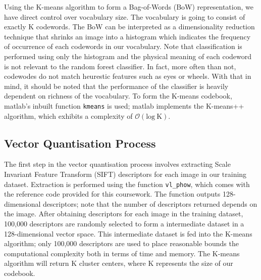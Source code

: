 \documentclass[a4paper,pra,twocolumn,10pt,aps,longbibliography,nobalancelastpage]{article}
\begin{document}
Using the K-means algorithm to form a Bag-of-Words (BoW) representation, we have direct control over vocabulary size. The vocabulary is going to consist of exactly K codewords. The BoW can be interpreted as a dimensionality reduction technique that shrinks an image into a histogram which indicates the frequency of occurrence of each codewords in our vocabulary. Note that classification is performed using only the histogram and the physical meaning of each codeword is not relevant to the random forest classifier. In fact, more often than not, codewodes do not match heurestic features such as eyes or wheels. With that in mind, it should be noted that the performance of the classifier is heavily dependent on richness of the vocabulary. To form the K-means codebook, matlab's inbuilt function \texttt{kmeans} is used; matlab implements the K-means++ algorithm\cite{arthur2007k}, which exhibits a complexity of $\mathcal{O}(\text{log} \ \text{K})$.

\subsection{Vector Quantisation Process}

The first step in the vector quantisation process involves extracting Scale Invariant Feature Transform (SIFT) descriptors for each image in our training dataset. Extraction is performed using the function \texttt{vl\_phow}, which comes with the reference code provided for this coursework. The function outputs 128-dimensional descriptors; note that the number of descriptors returned depends on the image. After obtaining descriptors for each image in the training dataset, 100,000 descriptors are randomly selected to form a intermediate dataset in a 128-dimensional vector space. This intermediate dataset is fed into the K-means algorithm; only 100,000 descriptors are used to place reasonable bounds the computational complexity both in terms of time and memory. The K-means algorithm will return K cluster centers, where K represents the size of our codebook.
\end{document}
